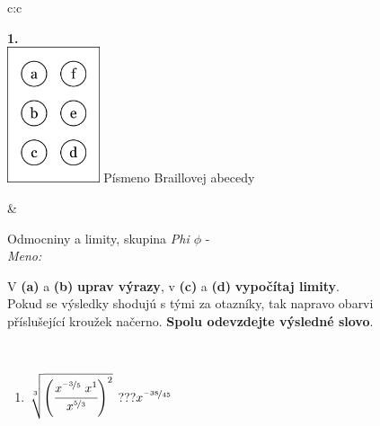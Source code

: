 \documentclass[10pt]{report}
\begin{document}
\begin{tabular}{c:c}
\begin{minipage}[c][104.5mm][t]{0.5\linewidth}
\begin{center}
\begin{minipage}{0.79\linewidth}
\begin{center}
\begin{varwidth}{\linewidth}
\begin{enumerate}
\end{enumerate}
\end{varwidth}
\end{center}
\end{minipage}
\begin{minipage}{0.20\linewidth}
\begin{center}
{\Huge\bfseries 1.} \\[2mm]
\includegraphics[height=40mm]{../images/braille.png}
{\small Písmeno Braillovej abecedy}
\end{center}
\end{minipage}
\end{center}
\end{minipage}
&
\begin{minipage}[c][104.5mm][t]{0.5\linewidth}
\begin{center}
\vspace{7mm}
{\huge Odmocniny a limity, skupina \textit{Phi $\phi$} -}\\[5mm]
\textit{Meno:}\phantom{xxxxxxxxxxxxxxxxxxxxxxxxxxxxxxxxxxxxxxxxxxxxxxxxxxxxxxxxxxxxxxxxx}\\[5mm]
\begin{minipage}{0.95\linewidth}
\begin{center}
V \textbf{(a)} a \textbf{(b)} \textbf{uprav výrazy}, v \textbf{(c)} a \textbf{(d)} \textbf{vypočítaj limity}.\\Pokud se výsledky shodujú s tými za otazníky, tak napravo obarvi\\příslušející kroužek načerno. \textbf{Spolu odevzdejte výsledné slovo}.
\end{center}
\end{minipage}
\\[1mm]
\begin{minipage}{0.79\linewidth}
\begin{center}
\begin{varwidth}{\linewidth}
\begin{enumerate}
\small
\item $\sqrt[3]{\left(\cfrac{x^{\nicefrac{-3}{5}}\;x^{1}}{x^{\nicefrac{5}{3}}}\right)^{2}}$\quad \dotfill\; ???\;\dotfill \quad $x^{\nicefrac{-38}{45}}$

\end{enumerate}
\end{varwidth}
\end{center}
\end{minipage}
\end{center}
\end{minipage}
\end{tabular}
\end{document}
